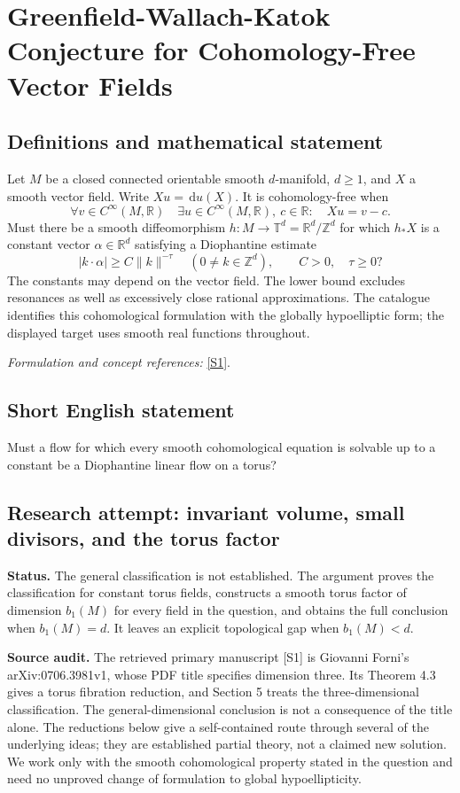 \documentclass[11pt]{article}
\begin{document}
\section*{\texorpdfstring{Greenfield-Wallach-Katok Conjecture for Cohomology-Free Vector Fields}{Greenfield-Wallach-Katok Conjecture for Cohomology-Free Vector Fields}}\label{460}
\subsection{Definitions and mathematical statement}
Let $M$ be a closed connected orientable smooth $d$-manifold, $d\ge1$, and $X$ a smooth vector field. Write $Xu={\,\mathrm{d}} u(X)$. It is cohomology-free when
\[
 \forall v\in C^\infty(M,{\mathbb{R}})\quad
 \exists u\in C^\infty(M,{\mathbb{R}}),\ c\in{\mathbb{R}}:\quad Xu=v-c.
\]
Must there be a smooth diffeomorphism $h:M\to\mathbb T^d={\mathbb{R}}^d/{\mathbb{Z}}^d$ for which $h_*X$ is a constant vector $\alpha\in{\mathbb{R}}^d$ satisfying a Diophantine estimate
\[
 |k\cdot\alpha|\ge C\|k\|^{-\tau}
 \quad(0\ne k\in{\mathbb{Z}}^d),\qquad C>0,\quad\tau\ge0?
\]
The constants may depend on the vector field. The lower bound excludes resonances as well as excessively close rational approximations. The catalogue identifies this cohomological formulation with the globally hypoelliptic form; the displayed target uses smooth real functions throughout.
\par\smallskip\textit{Formulation and concept references:} \href{https://arxiv.org/pdf/0706.3981}{[S1]}.

\subsection{Short English statement}
Must a flow for which every smooth cohomological equation is solvable up to a constant be a Diophantine linear flow on a torus?
\subsection{Research attempt: invariant volume, small divisors, and the torus factor}
\textbf{Status.} The general classification is not established. The argument proves the classification for constant torus fields, constructs a smooth torus factor of dimension $b_1(M)$ for every field in the question, and obtains the full conclusion when $b_1(M)=d$. It leaves an explicit topological gap when $b_1(M)<d$.

\textbf{Source audit.} The retrieved primary manuscript [S1] is Giovanni Forni's arXiv:0706.3981v1, whose PDF title specifies dimension three. Its Theorem 4.3 gives a torus fibration reduction, and Section 5 treats the three-dimensional classification. The general-dimensional conclusion is not a consequence of the title alone. The reductions below give a self-contained route through several of the underlying ideas; they are established partial theory, not a claimed new solution. We work only with the smooth cohomological property stated in the question and need no unproved change of formulation to global hypoellipticity.
\end{document}
